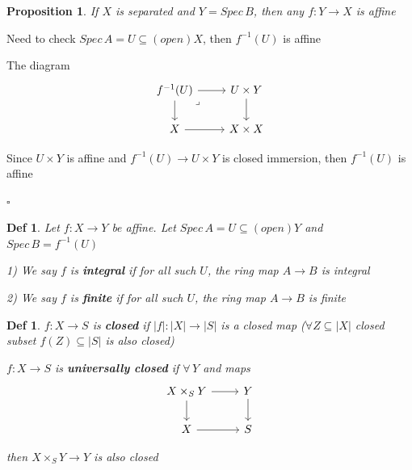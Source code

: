 \documentclass{article}
\newtheorem{definition}[theorem]{Def}
\newtheorem{proposition}[theorem]{Proposition}
\newenvironment{Proof}{{\noindent \indent \it Proof:\quad}}{\hfill $\square$\par}
\begin{document}
\begin{proposition}
    If $X$ is separated and $Y=Spec\, B$, then any $f:Y\to X$ is affine
\end{proposition}
\begin{Proof}
    Need to check $Spec\,A=U\subseteq (open) X$, then $f^{-1}(U)$ is affine

    The diagram 
    \[\begin{tikzcd}
	{f^{-1}(U)} & {U\times Y} \\
	X & {X\times X}
	\arrow[from=2-1, to=2-2]
	\arrow[from=1-1, to=2-1]
	\arrow[from=1-2, to=2-2]
	\arrow["\lrcorner"{anchor=center, pos=0.125}, draw=none, from=1-1, to=2-2]
	\arrow[from=1-1, to=1-2]
\end{tikzcd}\]

Since $U\times Y$ is affine and $f^{-1}(U)\to U\times Y$ is closed immersion, then $f^{-1}(U)$ is affine

\end{Proof}

\begin{definition}
    Let $f:X\to Y$ be affine. Let $Spec\, A=U\subseteq(open)Y$ and $Spec\,B=f^{-1}(U)$

    1) We say $f$ is \textbf{integral} if for all such $U$, the ring map $A\to B$ is integral

    2) We say $f$ is \textbf{finite} if for all such $U$, the ring map $A\to B$ is finite
\end{definition}

\begin{definition}
    $f:X\to S$ is \textbf{closed} if $|f|:|X|\to |S|$ is a closed map ($\forall Z\subseteq |X|$ closed subset $f(Z)\subseteq |S|$ is also closed)

    $f:X\to S$ is \textbf{universally closed} if  $\forall\, Y$ and maps
\[\begin{tikzcd}
	{X\times_S Y} & Y \\
	X & S
	\arrow[from=1-1, to=2-1]
	\arrow[from=2-1, to=2-2]
	\arrow[from=1-2, to=2-2]
	\arrow[from=1-1, to=1-2]
\end{tikzcd}\]

 then $X\times_S Y\to Y$ is also closed
\end{definition}
\end{document}
